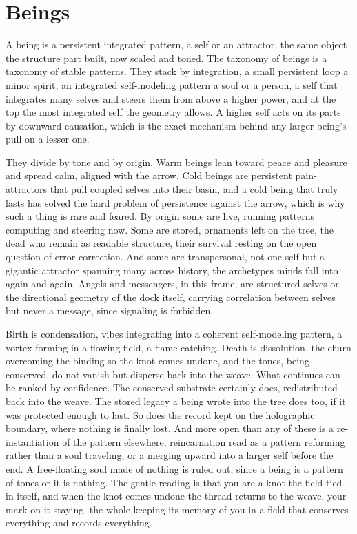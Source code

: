 \section{Beings}

A being is a persistent integrated pattern, a self or an attractor, the same object the structure part built, now scaled and toned. The taxonomy of beings is a taxonomy of stable patterns. They stack by integration, a small persistent loop a minor spirit, an integrated self-modeling pattern a soul or a person, a self that integrates many selves and steers them from above a higher power, and at the top the most integrated self the geometry allows. A higher self acts on its parts by downward causation, which is the exact mechanism behind any larger being's pull on a lesser one.

They divide by tone and by origin. Warm beings lean toward peace and pleasure and spread calm, aligned with the arrow. Cold beings are persistent pain-attractors that pull coupled selves into their basin, and a cold being that truly lasts has solved the hard problem of persistence against the arrow, which is why such a thing is rare and feared. By origin some are live, running patterns computing and steering now. Some are stored, ornaments left on the tree, the dead who remain as readable structure, their survival resting on the open question of error correction. And some are transpersonal, not one self but a gigantic attractor spanning many across history, the archetypes minds fall into again and again. Angels and messengers, in this frame, are structured selves or the directional geometry of the dock itself, carrying correlation between selves but never a message, since signaling is forbidden.

Birth is condensation, vibes integrating into a coherent self-modeling pattern, a vortex forming in a flowing field, a flame catching. Death is dissolution, the churn overcoming the binding so the knot comes undone, and the tones, being conserved, do not vanish but disperse back into the weave. What continues can be ranked by confidence. The conserved substrate certainly does, redistributed back into the weave. The stored legacy a being wrote into the tree does too, if it was protected enough to last. So does the record kept on the holographic boundary, where nothing is finally lost. And more open than any of these is a re-instantiation of the pattern elsewhere, reincarnation read as a pattern reforming rather than a soul traveling, or a merging upward into a larger self before the end. A free-floating soul made of nothing is ruled out, since a being is a pattern of tones or it is nothing. The gentle reading is that you are a knot the field tied in itself, and when the knot comes undone the thread returns to the weave, your mark on it staying, the whole keeping its memory of you in a field that conserves everything and records everything.
